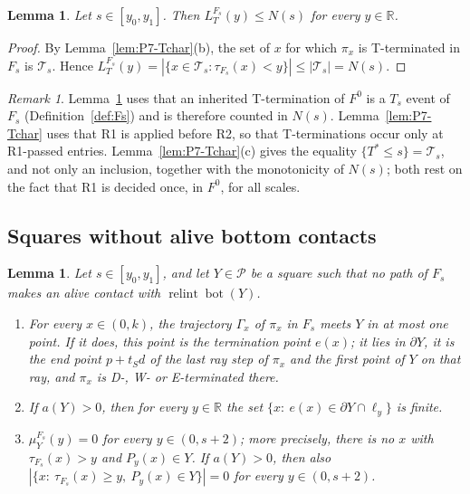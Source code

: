 \documentclass[11pt]{amsart}
\newcommand{\R}{\mathbb R}
\newcommand{\cP}{\mathcal P}
\newcommand{\cT}{\mathcal T}
\newcommand{\relint}{\operatorname{relint}}
\newcommand{\Bot}{\operatorname{bot}}
\newcommand{\Fz}{F^{0}}
\newcommand{\Fs}{F_{s}}
\newcommand{\Tstar}{T^{*}}
\newtheorem{lemma}[theorem]{Lemma}
\theoremstyle{definition}
\theoremstyle{remark}
\newtheorem{remark}[theorem]{Remark}
\numberwithin{equation}{section}
\begin{document}
\begin{lemma}\label{lem:P7-LT}
Let $s\in[y_0,y_1]$. Then $L^{\Fs}_T(y)\le N(s)$ for every $y\in\R$.
\end{lemma}

\begin{proof}
By Lemma~\ref{lem:P7-Tchar}(b), the set of $x$ for which $\pi_x$ is T-terminated in $\Fs$ is $\cT_s$. Hence $L^{\Fs}_T(y)=|\{x\in\cT_s:\tau_{\Fs}(x)<y\}|\le|\cT_s|=N(s)$.
\end{proof}

\begin{remark}\label{rem:P7-Tmax}
Lemma~\ref{lem:P7-LT} uses that an inherited T-termination of $\Fz$ is a $T_s$ event of $\Fs$ (Definition~\ref{def:Fs}) and is therefore counted in $N(s)$. Lemma~\ref{lem:P7-Tchar} uses that R1 is applied before R2, so that T-terminations occur only at R1-passed entries. Lemma~\ref{lem:P7-Tchar}(c) gives the equality $\{\Tstar\le s\}=\cT_s$, and not only an inclusion, together with the monotonicity of $N(s)$; both rest on the fact that R1 is decided once, in $\Fz$, for all scales.
\end{remark}

\subsection{Squares without alive bottom contacts}\label{ssec:P7-avoid}

\begin{lemma}\label{lem:P7-avoid}
Let $s\in[y_0,y_1]$, and let $Y\in\cP$ be a square such that no path of $\Fs$ makes an alive contact with $\relint\Bot(Y)$.
\begin{enumerate}[label=(\alph*)]
\item For every $x\in(0,k)$, the trajectory $\Gamma_x$ of $\pi_x$ in $\Fs$ meets $Y$ in at most one point. If it does, this point is the termination point $e(x)$; it lies in $\partial Y$, it is the end point $p+t_Sd$ of the last ray step of $\pi_x$ and the first point of $Y$ on that ray, and $\pi_x$ is D-, W- or E-terminated there.
\item If $a(Y)>0$, then for every $y\in\R$ the set $\{x:\ e(x)\in\partial Y\cap\ell_y\}$ is finite.
\item $\mu^{\Fs}_Y(y)=0$ for every $y\in(0,s+2)$; more precisely, there is no $x$ with $\tau_{\Fs}(x)>y$ and $P_y(x)\in Y$. If $a(Y)>0$, then also $|\{x:\ \tau_{\Fs}(x)\ge y,\ P_y(x)\in Y\}|=0$ for every $y\in(0,s+2)$.
\end{enumerate}
\end{lemma}
\end{document}
